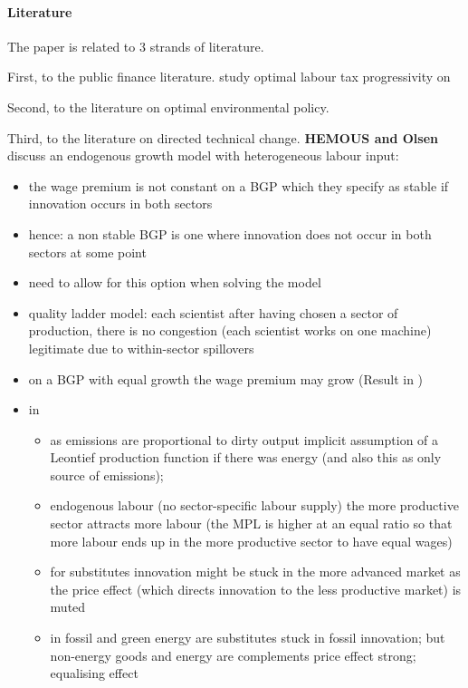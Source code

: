 \paragraph{Literature}

The paper is related to 3 strands of literature. 

First, to the public finance literature.  \cite{Heathcote2017OptimalFramework} study optimal labour tax progressivity on 



Second, to the literature on optimal environmental policy. 

Third, to the literature on directed technical change. 
\textbf{HEMOUS and Olsen} discuss an endogenous growth model with heterogeneous labour input:
\begin{itemize}
	\item the wage premium is not constant on a BGP which they specify as stable if innovation occurs in both sectors
	\item hence: a non stable BGP is one where innovation does not occur in both sectors at some point
	\item need to allow for this option when solving the model
	\item quality ladder model: each scientist after having chosen a sector of production, there is no congestion (each scientist works on one machine) legitimate due to within-sector spillovers
	\item on a BGP with equal growth the wage premium may grow (Result in \cite{Acemoglu2002DirectedChange}) 
	\item in \cite{Acemoglu2012TheChange} 
	\begin{itemize}
		\item as emissions are proportional to dirty output implicit assumption of a Leontief production function if there was energy (and also this as only source of emissions); 
		 \item endogenous labour (no sector-specific labour supply) \ar the more productive sector attracts more labour (the MPL is higher at an equal ratio so that more labour ends up in the more productive sector to have equal wages)
		 \item for substitutes innovation might be stuck in the more advanced market as the price effect (which directs innovation to the less productive market) is muted
		 \item[\ar] in \cite{Fried2018ClimateAnalysis} fossil and green energy are substitutes \ar stuck in fossil innovation; but non-energy goods and energy are complements \ar price effect strong; equalising effect

\end{itemize}
\end{itemize}
